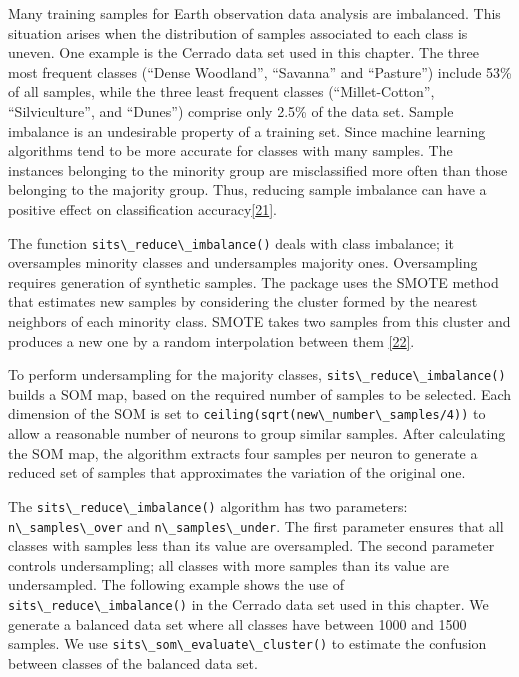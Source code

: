 \documentclass[
  11pt,
]{report}
\newcommand{\passthrough}[1]{#1}
\begin{document}
Many training samples for Earth observation data analysis are
imbalanced. This situation arises when the distribution of samples
associated to each class is uneven. One example is the Cerrado data set
used in this chapter. The three most frequent classes (``Dense
Woodland'', ``Savanna'' and ``Pasture'') include 53\% of all samples,
while the three least frequent classes (``Millet-Cotton'',
``Silviculture'', and ``Dunes'') comprise only 2.5\% of the data set.
Sample imbalance is an undesirable property of a training set. Since
machine learning algorithms tend to be more accurate for classes with
many samples. The instances belonging to the minority group are
misclassified more often than those belonging to the majority group.
Thus, reducing sample imbalance can have a positive effect on
classification accuracy\protect\hyperlink{ref-Johnson2019}{{[}21{]}}.

The function \passthrough{\lstinline!sits\_reduce\_imbalance()!} deals
with class imbalance; it oversamples minority classes and undersamples
majority ones. Oversampling requires generation of synthetic samples.
The package uses the SMOTE method that estimates new samples by
considering the cluster formed by the nearest neighbors of each minority
class. SMOTE takes two samples from this cluster and produces a new one
by a random interpolation between them
\protect\hyperlink{ref-Chawla2002}{{[}22{]}}.

To perform undersampling for the majority classes,
\passthrough{\lstinline!sits\_reduce\_imbalance()!} builds a SOM map,
based on the required number of samples to be selected. Each dimension
of the SOM is set to
\passthrough{\lstinline!ceiling(sqrt(new\_number\_samples/4))!} to allow
a reasonable number of neurons to group similar samples. After
calculating the SOM map, the algorithm extracts four samples per neuron
to generate a reduced set of samples that approximates the variation of
the original one.

The \passthrough{\lstinline!sits\_reduce\_imbalance()!} algorithm has
two parameters: \passthrough{\lstinline!n\_samples\_over!} and
\passthrough{\lstinline!n\_samples\_under!}. The first parameter ensures
that all classes with samples less than its value are oversampled. The
second parameter controls undersampling; all classes with more samples
than its value are undersampled. The following example shows the use of
\passthrough{\lstinline!sits\_reduce\_imbalance()!} in the Cerrado data
set used in this chapter. We generate a balanced data set where all
classes have between 1000 and 1500 samples. We use
\passthrough{\lstinline!sits\_som\_evaluate\_cluster()!} to estimate the
confusion between classes of the balanced data set.
\end{document}
